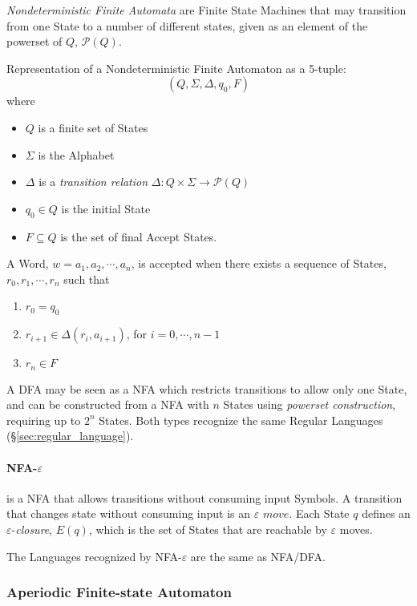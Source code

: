 \emph{Nondeterministic Finite Automata} are Finite State Machines that
may transition from one State to a number of different states, given
as an element of the powerset of $Q$, $\mathcal{P}(Q)$.

Representation of a Nondeterministic Finite Automaton as a
5-tuple:
\[
    (Q,\Sigma,\Delta,q_0,F)
\]
where
\begin{itemize}
\item $Q$ is a finite set of States
\item $\Sigma$ is the Alphabet
\item $\Delta$ is a \emph{transition relation} $\Delta: Q \times
  \Sigma \rightarrow \mathcal{P}(Q)$
\item $q_0 \in Q$ is the initial State
\item $F \subseteq Q$ is the set of final Accept States.
\end{itemize}

A Word, $w=a_1,a_2,\cdots,a_n$, is accepted when there exists a
sequence of States, $r_0,r_1,\cdots,r_n$ such that
\begin{enumerate}
\item $r_0 = q_0$
\item $r_{i+1} \in \Delta(r_i, a_{i+1})$, for $i = 0, \cdots, n-1$
\item $r_n \in F$
\end{enumerate}

A DFA may be seen as a NFA which restricts transitions to allow only
one State, and can be constructed from a NFA with $n$ States using
\emph{powerset construction}, requiring up to $2^n$ States. Both types
recognize the same Regular Languages
(\S\ref{sec:regular_language}).

\paragraph{NFA-$\varepsilon$} is a NFA that allows transitions
without consuming input Symbols. A transition that changes state
without consuming input is an $\varepsilon$ $move$. Each State $q$
defines an $\varepsilon$-\emph{closure}, $E(q)$, which is the set of
States that are reachable by $\varepsilon$ moves.

The Languages recognized by NFA-$\varepsilon$ are the same as NFA/DFA.



\subsubsection{Aperiodic Finite-state Automaton}
\label{sec:aperiodic_automaton}



